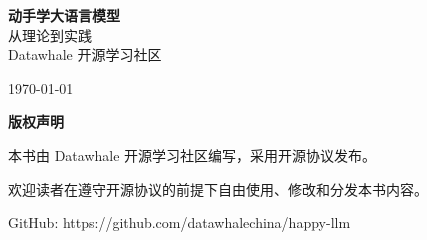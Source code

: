 \documentclass[12pt,a4paper]{book}
\begin{document}
\begin{titlepage}
    \centering
    \vspace*{2cm}
    
    {\Huge\bfseries 动手学大语言模型}\\[2cm]
    
    {\Large 从理论到实践}\\[1cm]
    
    {\large Datawhale 开源学习社区}\\[2cm]
    
    \vfill
    
    {\large \today}
\end{titlepage}

\newpage
\thispagestyle{empty}
\vspace*{2cm}
\begin{center}
    \textbf{版权声明}
    
    \vspace{1cm}
    
    本书由 Datawhale 开源学习社区编写，采用开源协议发布。
    
    欢迎读者在遵守开源协议的前提下自由使用、修改和分发本书内容。
    
    \vspace{1cm}
    
    GitHub: https://github.com/datawhalechina/happy-llm
\end{center}

\tableofcontents
\newpage

\end{document}
